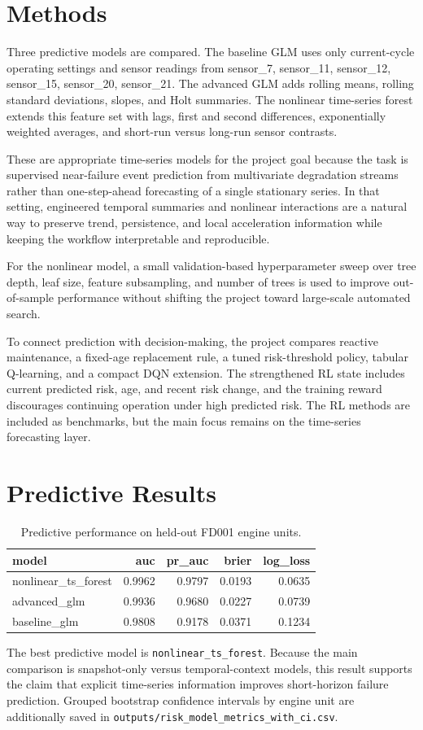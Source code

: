 \documentclass[11pt]{article}
\begin{document}
\section{Methods}
Three predictive models are compared. The baseline GLM uses only current-cycle operating settings and sensor readings from sensor\_7, sensor\_11, sensor\_12, sensor\_15, sensor\_20, sensor\_21. The advanced GLM adds rolling means, rolling standard deviations, slopes, and Holt summaries. The nonlinear time-series forest extends this feature set with lags, first and second differences, exponentially weighted averages, and short-run versus long-run sensor contrasts.

These are appropriate time-series models for the project goal because the task is supervised near-failure event prediction from multivariate degradation streams rather than one-step-ahead forecasting of a single stationary series. In that setting, engineered temporal summaries and nonlinear interactions are a natural way to preserve trend, persistence, and local acceleration information while keeping the workflow interpretable and reproducible.

For the nonlinear model, a small validation-based hyperparameter sweep over tree depth, leaf size, feature subsampling, and number of trees is used to improve out-of-sample performance without shifting the project toward large-scale automated search.

To connect prediction with decision-making, the project compares reactive maintenance, a fixed-age replacement rule, a tuned risk-threshold policy, tabular Q-learning, and a compact DQN extension. The strengthened RL state includes current predicted risk, age, and recent risk change, and the training reward discourages continuing operation under high predicted risk. The RL methods are included as benchmarks, but the main focus remains on the time-series forecasting layer.

\section{Predictive Results}
\begin{table}[H]
\centering
\caption{Predictive performance on held-out FD001 engine units.}
\label{tab:risk-metrics}
\small
\begin{tabular}{lrrrr}
\toprule
model & auc & pr\_auc & brier & log\_loss \\
\midrule
nonlinear\_ts\_forest & 0.9962 & 0.9797 & 0.0193 & 0.0635 \\
advanced\_glm & 0.9936 & 0.9680 & 0.0227 & 0.0739 \\
baseline\_glm & 0.9808 & 0.9178 & 0.0371 & 0.1234 \\
\bottomrule
\end{tabular}
\end{table}
The best predictive model is \texttt{nonlinear\_ts\_forest}. Because the main comparison is snapshot-only versus temporal-context models, this result supports the claim that explicit time-series information improves short-horizon failure prediction.
Grouped bootstrap confidence intervals by engine unit are additionally saved in \texttt{outputs/risk\_model\_metrics\_with\_ci.csv}.
\end{document}
